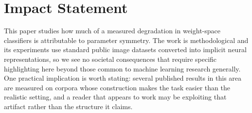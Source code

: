 \documentclass{article}
\theoremstyle{plain}
\theoremstyle{definition}
\theoremstyle{remark}
\begin{document}












\section*{Impact Statement}

This paper studies how much of a measured degradation in weight-space classifiers is attributable to
parameter symmetry. The work is methodological and its experiments use standard public image
datasets converted into implicit neural representations, so we see no societal consequences that
require specific highlighting here beyond those common to machine learning research generally. One
practical implication is worth stating: several published results in this area are measured on
corpora whose construction makes the task easier than the realistic setting, and a reader that
appears to work may be exploiting that artifact rather than the structure it claims.

\small



\normalsize
\appendix
\onecolumn

\end{document}
